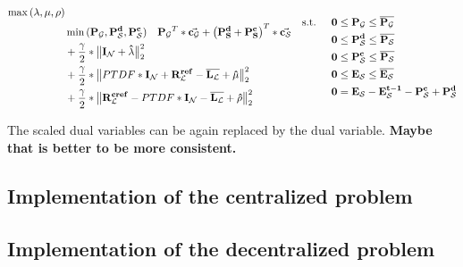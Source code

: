 \begin{subequations}
	\begin{align}
		\max{(\lambda, \mu, \rho)} \label{eq:opt_admm_matrix_scaled}\\
		 & \min{(\vb{P_\mathcal{G}}, \vb{P_\mathcal{S}^d}, \vb{P_\mathcal{S}^c})} \quad \vb{P_\mathcal{G}}^T * \va{c_\mathcal{G}} + \left(\vb{P_S^d} + \vb{P_S^c}\right)^T * \va{c_\mathcal{S}} \nonumber \\
		 & + \frac{\gamma}{2} * \big\|\vb{I_\mathcal{N}} + \vb{\hat{\lambda}}\big\|_2^2 \nonumber \\
		 & + \frac{\gamma}{2} * \big\| PTDF * \vb{I_\mathcal{N}} + \vb{R_\mathcal{L}^{ref}} - \vb{\overline{L_\mathcal{L}}} + \vb{\hat{\mu}} \big\|_2^2 \nonumber \\
		 & + \frac{\gamma}{2} * \big\| \vb{R_\mathcal{L}^{cref}} - PTDF * \vb{I_\mathcal{N}} - \vb{\overline{L_\mathcal{L}}} + \vb{\hat{\rho}} \big\|_2^2 \nonumber
	\end{align}
		\begin{align}
		 \text{s.t. } \quad & \vb{0} \leq \vb{P_\mathcal{G}} \leq \vb{\overline{P_\mathcal{G}}} \\
		 & \vb{0} \leq \vb{P_\mathcal{S}^d} \leq \vb{\overline{P_\mathcal{S}}} \\
		 & \vb{0} \leq \vb{P_\mathcal{S}^c} \leq \vb{\overline{P_\mathcal{S}}} \\
		 & \vb{0} \leq \vb{E_\mathcal{S}} \leq \vb{\overline{E_\mathcal{S}}}\\
		 & \vb{0} = \vb{E_\mathcal{S}} - \vb{E_\mathcal{S}^{t-1}} - \vb{P_\mathcal{S}^c} + \vb{P_\mathcal{S}^d}
	\end{align}
\end{subequations}

The scaled dual variables can be again replaced by the dual variable. \textbf{Maybe that is better to be more consistent.}


\subsection{Implementation of the centralized problem}

\subsection{Implementation of the decentralized problem}
